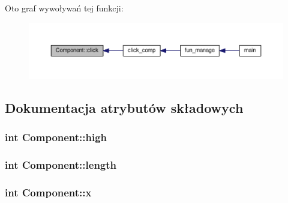 Oto graf wywoływań tej funkcji\+:\nopagebreak
\begin{figure}[H]
\begin{center}
\leavevmode
\includegraphics[width=350pt]{classComponent_a247f6f0204b68a7efb9059cf709fe6ea_icgraph}
\end{center}
\end{figure}




\subsection{Dokumentacja atrybutów składowych}
\subsubsection[{\texorpdfstring{high}{high}}]{\setlength{\rightskip}{0pt plus 5cm}int Component\+::high\hspace{0.3cm}{\ttfamily [private]}}\hypertarget{classComponent_aff8a286217041306964f2207b86522b3}{}\label{classComponent_aff8a286217041306964f2207b86522b3}
\subsubsection[{\texorpdfstring{length}{length}}]{\setlength{\rightskip}{0pt plus 5cm}int Component\+::length\hspace{0.3cm}{\ttfamily [private]}}\hypertarget{classComponent_a4d25a50d4bfa8fde7f75478eadcd5661}{}\label{classComponent_a4d25a50d4bfa8fde7f75478eadcd5661}
\subsubsection[{\texorpdfstring{x}{x}}]{\setlength{\rightskip}{0pt plus 5cm}int Component\+::x\hspace{0.3cm}{\ttfamily [private]}}\hypertarget{classComponent_a3fe84cea3e41ac363349595e1a92a5b6}{}\label{classComponent_a3fe84cea3e41ac363349595e1a92a5b6}
